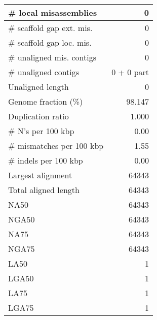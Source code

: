 \documentclass[12pt,a4paper]{article}
\begin{document}
\begin{table}[ht]
\begin{center}
\begin{tabular}{|l*{1}{|r}|}
\# local misassemblies & 0 \\ \hline
\# scaffold gap ext. mis. & 0 \\ \hline
\# scaffold gap loc. mis. & 0 \\ \hline
\# unaligned mis. contigs & 0 \\ \hline
\# unaligned contigs & 0 + 0 part \\ \hline
Unaligned length & 0 \\ \hline
Genome fraction (\%) & 98.147 \\ \hline
Duplication ratio & 1.000 \\ \hline
\# N's per 100 kbp & 0.00 \\ \hline
\# mismatches per 100 kbp & 1.55 \\ \hline
\# indels per 100 kbp & 0.00 \\ \hline
Largest alignment & 64343 \\ \hline
Total aligned length & 64343 \\ \hline
NA50 & 64343 \\ \hline
NGA50 & 64343 \\ \hline
NA75 & 64343 \\ \hline
NGA75 & 64343 \\ \hline
LA50 & 1 \\ \hline
LGA50 & 1 \\ \hline
LA75 & 1 \\ \hline
LGA75 & 1 \\ \hline
\end{tabular}
\end{center}
\end{table}
\end{document}
